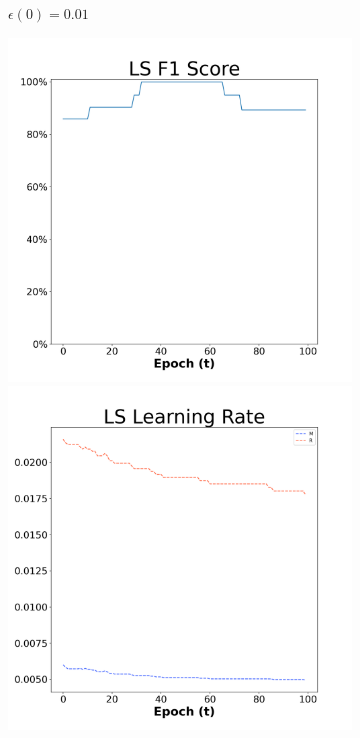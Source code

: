\begin{figure}[H]
\begin{subfigure}{0.3\textwidth}
  \caption{$\epsilon(0)=0.01$}
\end{subfigure}\hfil %
\begin{subfigure}{0.3\textwidth}
  \includegraphics[width=\linewidth]{images/exper2/Sonar/LS_0.03_f1.png}
  \includegraphics[width=\linewidth]{images/exper2/Sonar/LS_0.03_lr.png}

\end{subfigure}
\end{figure}
